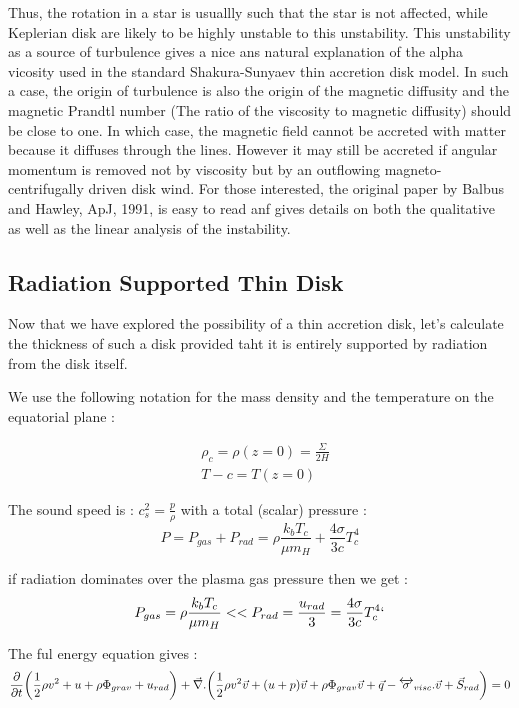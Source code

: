 \documentclass[10pt,a4paper,english,draft]{article}
\begin{document}
Thus, the rotation in a star is usuallly such that the star is not affected, while Keplerian
disk are likely to be highly unstable  to this unstability. This unstability as a source of 
turbulence gives a  nice ans natural explanation of the alpha vicosity  used in the standard
Shakura-Sunyaev thin accretion disk model. In such a case,  the origin of turbulence is also 
the origin of the magnetic diffusity and the magnetic Prandtl number (The ratio of the viscosity to magnetic
diffusity) should be close to one. In which case, the magnetic field cannot be accreted with matter because it
diffuses through the lines. However it may still be accreted if angular momentum is removed not by viscosity
but by an outflowing  magneto-centrifugally driven disk wind. For those interested, the original paper by Balbus
and Hawley, ApJ, 1991, is easy to read anf gives details on both the qualitative as well as the linear 
analysis of the instability.


\subsection{Radiation Supported Thin Disk}

Now that we have explored the possibility of a thin accretion disk, let's calculate the thickness 
of such a disk provided taht it is entirely supported by radiation from the disk itself.

We use the following notation for the mass density and the temperature on the equatorial  plane : 

\begin{align}
	& \rho_c = \rho(z=0) = \frac{\Sigma}{2H} \\
	& T-c = T(z=0)
\end{align}

The sound speed is : $c_s^2 = \frac{p}{\rho}$ with a total (scalar) pressure : 
\begin{equation}
P = P_{gas} + P_{rad}  = \rho \frac{k_b T_c}{\mu m_H} + \frac{4\sigma}{3 c}T_c^4
\end{equation}

if radiation dominates over the plasma gas pressure then we get : 
\begin{equation}
P_{gas} = \rho \frac{k_b T_c}{\mu m_H} << P_{rad} = \frac{u_{rad}}{3} = \frac{4\sigma}{3 c}T_c^4`
\end{equation}

The ful energy equation gives : 
\begin{equation}
\frac{\partial}{\partial t } \bigg (
\frac{1}{2}\rho v^2 + u + \rho \Phi_{grav} + u_{rad} \bigg) + 
\vec{\nabla}.\bigg(  
\frac{1}{2}\rho v^2 \vec{v} + (u + p)\vec{v} + \rho \Phi_{grav}\vec{v} + 
\vec{q} - \overleftrightarrow{\sigma}_{visc}.\vec{v} + \vec{S}_{rad}
\bigg) = 0
\end{equation}
\end{document}
